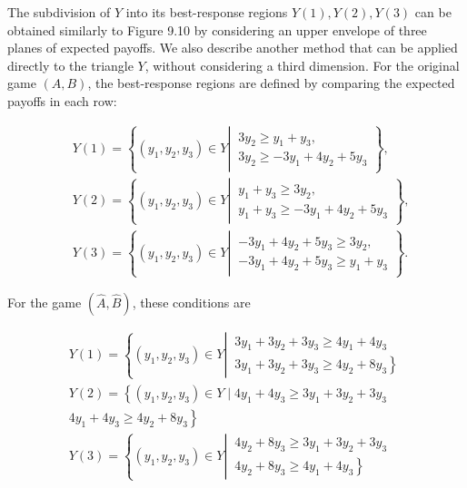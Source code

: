 \documentclass[12pt]{article}
\begin{document}
The subdivision of $Y$ into its best-response regions $Y(1), Y(2), Y(3)$ can be obtained similarly to Figure 9.10 by considering an upper envelope of three planes of expected payoffs. We also describe another method that can be applied directly to the triangle $Y$, without considering a third dimension. For the original game $(A, B)$, the best-response regions are defined by comparing the expected payoffs in each row:


\begin{align*}
& Y(1)=\left\{\left(y_{1}, y_{2}, y_{3}\right) \in Y \left\lvert\, \begin{array}{l}
3 y_{2} \geq y_{1}+y_{3}, \\
3 y_{2} \geq-3 y_{1}+4 y_{2}+5 y_{3}
\end{array}\right.\right\}, \\
& Y(2)=\left\{\left(y_{1}, y_{2}, y_{3}\right) \in Y \left\lvert\, \begin{array}{l}
y_{1}+y_{3} \geq 3 y_{2}, \\
y_{1}+y_{3} \geq-3 y_{1}+4 y_{2}+5 y_{3}
\end{array}\right.\right\}, \\
& Y(3)=\left\{\left(y_{1}, y_{2}, y_{3}\right) \in Y \left\lvert\, \begin{array}{l}
-3 y_{1}+4 y_{2}+5 y_{3} \geq 3 y_{2}, \\
-3 y_{1}+4 y_{2}+5 y_{3} \geq y_{1}+y_{3}
\end{array}\right.\right\} . \tag{9.14}
\end{align*}


For the game $(\hat{A}, \hat{B})$, these conditions are


\begin{gather*}
Y(1)=\left\{\left(y_{1}, y_{2}, y_{3}\right) \in Y \left\lvert\, \begin{array}{r}
3 y_{1}+3 y_{2}+3 y_{3} \geq 4 y_{1}+4 y_{3} \\
\left.3 y_{1}+3 y_{2}+3 y_{3} \geq 4 y_{2}+8 y_{3}\right\}
\end{array}\right.\right. \\
Y(2)=\left\{\left(y_{1}, y_{2}, y_{3}\right) \in Y \mid 4 y_{1}+4 y_{3} \geq 3 y_{1}+3 y_{2}+3 y_{3}\right. \\
\left.4 y_{1}+4 y_{3} \geq 4 y_{2}+8 y_{3}\right\} \\
Y(3)=\left\{\left(y_{1}, y_{2}, y_{3}\right) \in Y \left\lvert\, \begin{array}{l}
4 y_{2}+8 y_{3} \geq 3 y_{1}+3 y_{2}+3 y_{3} \\
\left.4 y_{2}+8 y_{3} \geq 4 y_{1}+4 y_{3}\right\}
\end{array}\right.\right. \tag{9.15}
\end{gather*}
\end{document}
